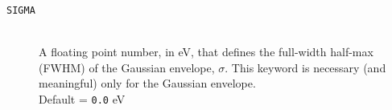 \documentclass[12pt]{article}
\begin{document}
\begin{description}
      \item[\texttt{SIGMA}] \hfill \\ 
         A floating point number, in eV, that defines the full-width half-max (FWHM) of the Gaussian envelope, $\sigma$. This keyword is necessary (and meaningful) only for the Gaussian envelope.  \\
         Default = \texttt{0.0} eV


    \end{description}

    
    
    
\end{document}
